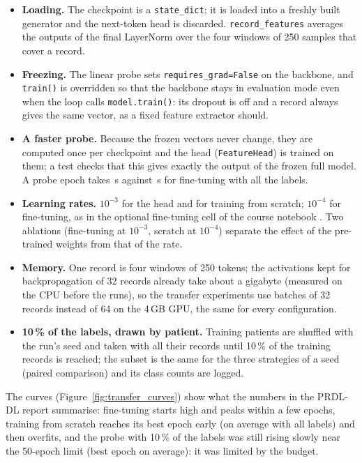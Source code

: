 \begin{itemize}[leftmargin=1.2em,itemsep=1pt]
  \item \textbf{Loading.} The checkpoint is a \texttt{state\_dict}; it is loaded into a freshly built
        generator and the next-token head is discarded. \texttt{record\_features} averages the outputs of
        the final LayerNorm over the four windows of 250 samples that cover a record.
  \item \textbf{Freezing.} The linear probe sets \texttt{requires\_grad=False} on the backbone, and
        \texttt{train()} is overridden so that the backbone stays in evaluation mode even when the loop
        calls \texttt{model.train()}: its dropout is off and a record always gives the same vector, as a
        fixed feature extractor should.
  \item \textbf{A faster probe.} Because the frozen vectors never change, they are computed once per
        checkpoint and the head (\texttt{FeatureHead}) is trained on them; a test checks that this gives
        exactly the output of the frozen full model. A probe epoch takes
        \transferEpochTimeMedianProbeFOneZeroZero{}\,s against \transferEpochTimeMedianFinetuneFOneZeroZero{}\,s
        for fine-tuning with all the labels.
  \item \textbf{Learning rates.} $10^{-3}$ for the head and for training from scratch; $10^{-4}$ for
        fine-tuning, as in the optional fine-tuning cell of the course notebook \cite{course_nb_transfer}.
        Two ablations (fine-tuning at $10^{-3}$, scratch at $10^{-4}$) separate the effect of the
        pre-trained weights from that of the rate.
  \item \textbf{Memory.} One record is four windows of 250 tokens; the activations kept for
        backpropagation of 32 records already take about a gigabyte (measured on the CPU before the runs),
        so the transfer experiments use batches of 32 records instead of 64 on the 4\,GB GPU, the same for
        every configuration.
  \item \textbf{10\,\% of the labels, drawn by patient.} Training patients are shuffled with the run's
        seed and taken with all their records until 10\,\% of the training records is reached; the subset
        is the same for the three strategies of a seed (paired comparison) and its class counts are logged.
\end{itemize}



The curves (Figure~\ref{fig:transfer_curves}) show what the numbers in the PRDL-DL report summarise:
fine-tuning starts high and peaks within a few epochs, training from scratch reaches its best epoch early (on average
\intval{\transferBestEpochMeanScratchFOneZeroZero} with all labels) and then overfits, and the probe with 10\,\% of the labels was still rising slowly near the 50-epoch limit (best
epoch \intval{\transferBestEpochMeanProbeFOneZero} on average): it was limited by the budget.

